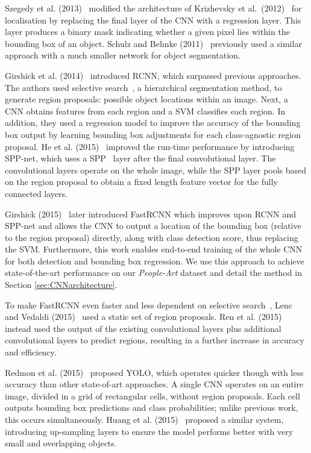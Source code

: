 \documentclass[runningheads]{llncs}
\begin{document}
Szegedy et al. (2013)~\cite{szegedy2013deep} modified the architecture of Krizhevsky et al.\ (2012)~\cite{krizhevsky2012imagenet} for localisation by replacing the final layer of the \ac{CNN} with a regression layer.
This layer produces a binary mask indicating whether a given pixel lies within the bounding box of an object.
Schulz and Behnke (2011)~\cite{schulz2011object} previously used a similar approach with a much smaller network for object segmentation.

Girshick et al. (2014)~\cite{girshick2014rich} introduced \ac{RCNN}, which surpassed previous approaches.
The authors used selective search~\cite{uijlings2013selective}, a hierarchical segmentation method, to generate region proposals: possible object locations within an image.
Next, a \ac{CNN} obtains features from each region and a \ac{SVM} classifies each region.
In addition, they used a regression model to improve the accuracy of the bounding box output by learning bounding box adjustments for each class-agnostic region proposal.
He et al. (2015)~\cite{he2015spatial} improved the run-time performance by introducing SPP-net, which uses a \ac{SPP}~\cite{grauman2005pyramid,lazebnik2006beyond} layer after the final convolutional layer.
The convolutional layers operate on the whole image, while the \ac{SPP} layer pools based on the region proposal to obtain a fixed length feature vector for the fully connected layers.

Girshick (2015)~\cite{girshick2015fast} later introduced \ac{FastRCNN} which improves upon \ac{RCNN} and SPP-net and allows the \ac{CNN} to output a location of the bounding box (relative to the region proposal) directly, along with class detection score, thus replacing the \ac{SVM}.
Furthermore, this work enables end-to-end training of the whole \ac{CNN} for both detection and bounding box regression.
We use this approach to achieve state-of-the-art performance on our \emph{People-Art} dataset and detail the method in Section \ref{sec:CNNarchitecture}.

To make \ac{FastRCNN} even faster and less dependent on selective search~\cite{uijlings2013selective}, Lenc and Vedaldi (2015)~\cite{lenc2015r} used a static set of region proposals.
Ren et al. (2015)~\cite{ren2015faster} instead used the output of the existing convolutional layers plus additional convolutional layers to predict regions, resulting in a further increase in accuracy and efficiency.

Redmon et al. (2015)~\cite{redmon2015you} proposed \ac{YOLO}, which operates quicker though with less accuracy than other state-of-art approaches.
A single \ac{CNN} operates on an entire image, divided in a grid of rectangular cells, without region proposals.
Each cell outputs bounding box predictions and class probabilities;
unlike previous work, this occurs simultaneously.
Huang et al. (2015)~\cite{huang2015densebox} proposed a similar system, introducing up-sampling layers to ensure the model performs better with very small and overlapping objects.
\end{document}
